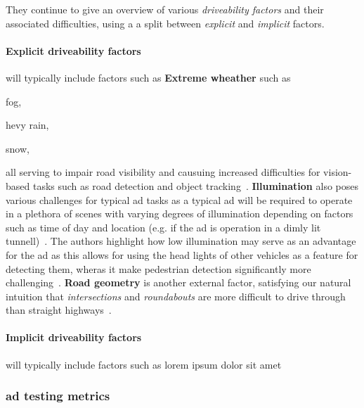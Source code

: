 They continue to give an overview of various \textit{driveability factors} and
their associated difficulties, using a a split between \textit{explicit} and
\textit{implicit} factors.

\paragraph{Explicit driveability factors} will typically include factors such as
\textbf{Extreme wheather} such as \begin{inparaenum}
    \item fog,
    \item hevy rain,
    \item snow,
\end{inparaenum}
all serving to impair road visibility and causuing increased difficulties for
vision-based tasks such as road detection and object
tracking~\cite[3136-3137]{safeToDrive}. \textbf{Illumination} also poses
various challenges for typical \acrshort{ad} tasks as a typical \acrshort{ad}
will be required to operate in a plethora of scenes with varying degrees of
illumination depending on factors such as time of day and location (e.g. if the
\acrshort{ad} is operation in a dimly lit tunnell)~\cite[3137]{safeToDrive}. The
authors highlight how low illumination may serve as an advantage for the
\acrshort{ad} as this allows for using the head lights of other vehicles as a
feature for detecting them, wheras it make pedestrian detection significantly
more challenging~\cite[3137]{safeToDrive}. \textbf{Road geometry} is another
external factor, satisfying our natural intuition that \textit{intersections}
and \textit{roundabouts} are more difficult to drive through than straight
highways~\cite[3137]{safeToDrive}.

\paragraph{Implicit driveability factors} will typically include factors such as
lorem ipsum dolor sit amet

\subsubsection*{\acrlong{ad} testing metrics}\label{sec:adsMetrics}

